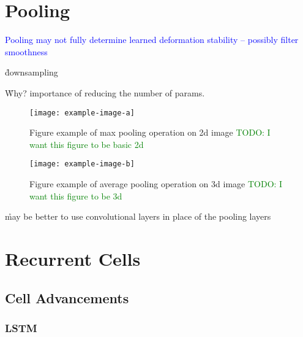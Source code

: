 \section{Pooling}


\textcolor{blue}{Pooling may not fully determine learned deformation stability -- possibly filter smoothness\cite{ruderman2018learned}}

\r{downsampling}

\r{Why? importance of reducing the number of params.}




\begin{figure}[htp]
	\centering
	\texttt{[image: example-image-a]}\hfil
	\caption{Figure example of max pooling operation on 2d image \textcolor{green}{TODO: I want this figure to be basic 2d}}
	\label{fig:pooling_max_2d_ex_a}
\end{figure}

\begin{figure}[htp]
	\centering
	\texttt{[image: example-image-b]}\hfil
	\caption{Figure example of average pooling operation on 3d image \textcolor{green}{TODO: I want this figure to be 3d}}
	\label{fig:pooling_avg_3d_ex_a}
\end{figure}


\r{may be better to use convolutional layers in place of the pooling layers\cite{springenberg2014striving}}

\section{Recurrent Cells}

\subsection{Cell Advancements}

\subsubsection{LSTM}


